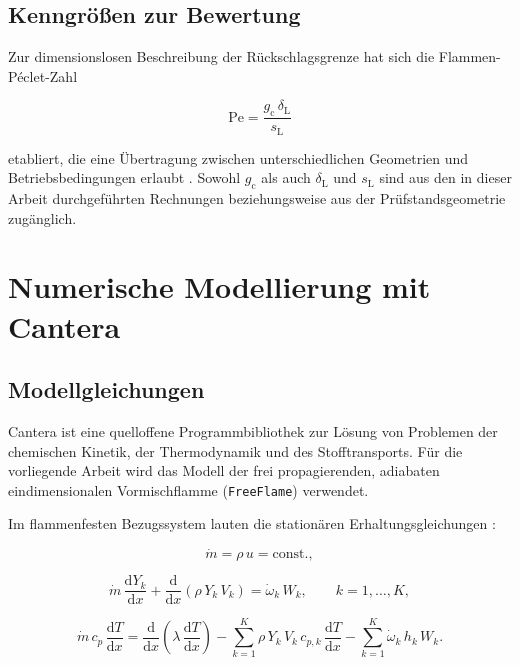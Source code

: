 \subsection{Kenngrößen zur Bewertung}\label{subsec:kenngroessen}

Zur dimensionslosen Beschreibung der Rückschlagsgrenze hat sich die
Flammen-Péclet-Zahl

\begin{equation}
	\label{eq:peclet}
	\mathrm{Pe} = \frac{g_\mathrm{c}\,\delta_\mathrm{L}}{s_\mathrm{L}}
\end{equation}

etabliert, die eine Übertragung zwischen unterschiedlichen Geometrien und
Betriebsbedingungen erlaubt \cite{Kalantari_2017}. Sowohl $g_\mathrm{c}$ als
auch $\delta_\mathrm{L}$ und $s_\mathrm{L}$ sind aus den in dieser Arbeit
durchgeführten Rechnungen beziehungsweise aus der Prüfstandsgeometrie
zugänglich.

\section{Numerische Modellierung mit Cantera}\label{sec:cantera}

\subsection{Modellgleichungen}\label{subsec:modellgleichungen}

Cantera \cite{Cantera_2023} ist eine quelloffene Programmbibliothek zur
Lösung von Problemen der chemischen Kinetik, der Thermodynamik und des
Stofftransports. Für die vorliegende Arbeit wird das Modell der frei
propagierenden, adiabaten eindimensionalen Vormischflamme
(\texttt{FreeFlame}) verwendet.

Im flammenfesten Bezugssystem lauten die stationären Erhaltungsgleichungen
\cite{Poinsot_2011, Cantera_2023}:

\begin{equation}
	\label{eq:kontinuitaet}
	\dot{m} = \rho\,u = \mathrm{const.},
\end{equation}

\begin{equation}
	\label{eq:spezies}
	\dot{m}\,\frac{\mathrm{d}Y_k}{\mathrm{d}x}
	+ \frac{\mathrm{d}}{\mathrm{d}x}\left(\rho\,Y_k\,V_k\right)
	= \dot{\omega}_k\,W_k,
	\qquad k = 1,\ldots,K,
\end{equation}

\begin{equation}
	\label{eq:energie}
	\dot{m}\,c_p\,\frac{\mathrm{d}T}{\mathrm{d}x}
	= \frac{\mathrm{d}}{\mathrm{d}x}\left(\lambda\,\frac{\mathrm{d}T}{\mathrm{d}x}\right)
	- \sum_{k=1}^{K}\rho\,Y_k\,V_k\,c_{p,k}\,\frac{\mathrm{d}T}{\mathrm{d}x}
	- \sum_{k=1}^{K} \dot{\omega}_k\,h_k\,W_k.
\end{equation}

